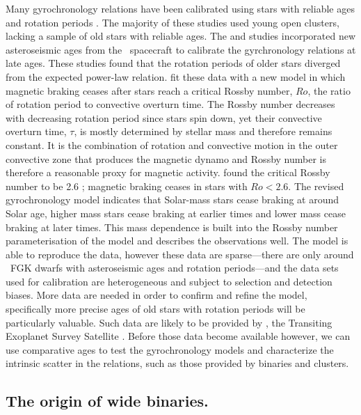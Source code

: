 Many gyrochronology relations have been calibrated using stars with reliable
ages and rotation periods \citep[\eg][]{Barnes2007, Mamajek2008, Meibom2010,
Angus2015, Vansaders2016}.
The majority of these studies used young open clusters, lacking a sample of
old stars with reliable ages.
The \citet{Angus2015} and \citet{Vansaders2016} studies incorporated new
asteroseismic ages from the \kepler\ spacecraft \citep{borucki2010} to
calibrate the gyrchronology relations at late ages.
These studies found that the rotation periods of older stars diverged from the
expected power-law relation.
\citet{Vansaders2016} fit these data with a new model in which magnetic
braking ceases after stars reach a critical Rossby number, $Ro$, the ratio of
rotation period to convective overturn time.
The Rossby number decreases with decreasing rotation period since stars spin
down, yet their convective overturn time, $\tau$, is mostly determined by
stellar mass and therefore remains constant.
It is the combination of rotation and convective motion in the outer
convective zone that produces the magnetic dynamo and Rossby number is
therefore a reasonable proxy for magnetic activity.
\citet{Vansaders2016} found the critical Rossby number to be 2.6
; magnetic braking ceases in stars with $Ro < 2.6$.
The revised \citet{Vansaders2016} gyrochronology model indicates that
Solar-mass stars cease braking at around Solar age, higher mass stars cease
braking at earlier times and lower mass cease braking at later times.
This mass dependence is built into the Rossby number parameterisation of the
\citet{Vansaders2016} model and describes the observations well.
The \citet{Vansaders2016} model is able to reproduce the data, however these
data are sparse---there are only around \nastero\ FGK dwarfs with
asteroseismic ages and rotation periods---and the data sets used for
calibration are heterogeneous and subject to selection and detection biases.
More data are needed in order to confirm and refine the \citet{Vansaders2016}
model, specifically more precise ages of old stars with rotation periods will
be particularly valuable.
Such data are likely to be provided by \tess, the Transiting Exoplanet Survey
Satellite \citep{ricker2015}.
Before those data become available however, we can use comparative ages to
test the gyrochronology models and characterize the intrinsic scatter in the
relations, such as those provided by binaries and clusters.

\subsection{The origin of wide binaries.}

